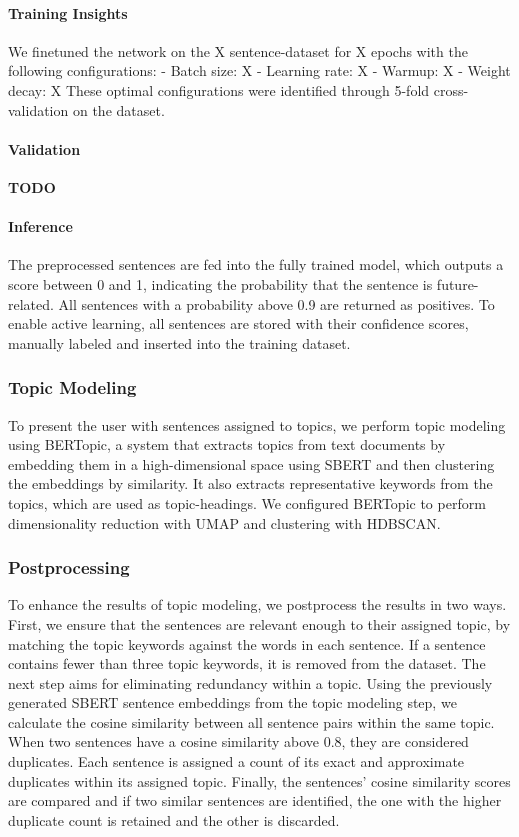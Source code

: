 \documentclass[10pt,twocolumn]{article}
\begin{document}
\paragraph{Training Insights}
We finetuned the network on the X sentence-dataset for X epochs with the following configurations:
	- Batch size: X
	- Learning rate: X
	- Warmup: X
	- Weight decay: X
These optimal configurations were identified through 5-fold cross-validation on the dataset.

\paragraph{Validation}
\textbf{TODO}

\paragraph{Inference}
The preprocessed sentences are fed into the fully trained model, which outputs a score between 0 and 1, indicating the probability that the sentence is future-related. All sentences with a probability above 0.9 are returned as positives. To enable active learning, all sentences are stored with their confidence scores, manually labeled and inserted into the training dataset.

\subsubsection{Topic Modeling}
To present the user with sentences assigned to topics, we perform topic modeling using BERTopic, a system that extracts topics from text documents by embedding them in a high-dimensional space using SBERT and then clustering the embeddings by similarity.
It also extracts representative keywords from the topics, which are used as topic-headings. We configured BERTopic to perform dimensionality reduction with UMAP and clustering with HDBSCAN.

\subsubsection{Postprocessing}

To enhance the results of topic modeling, we postprocess the results in two ways.
First, we ensure that the sentences are relevant enough to their assigned topic, by matching the topic keywords against the words in each sentence. If a sentence contains fewer than three topic keywords, it is removed from the dataset.
The next step aims for eliminating redundancy within a topic. Using the previously generated SBERT sentence embeddings from the topic modeling step, we calculate the cosine similarity between all sentence pairs within the same topic. When two sentences have a cosine similarity above 0.8, they are considered duplicates. Each sentence is assigned a count of its exact and approximate duplicates within its assigned topic. Finally, the sentences' cosine similarity scores are compared and if two similar sentences are identified, the one with the higher duplicate count is retained and the other is discarded.
\end{document}
